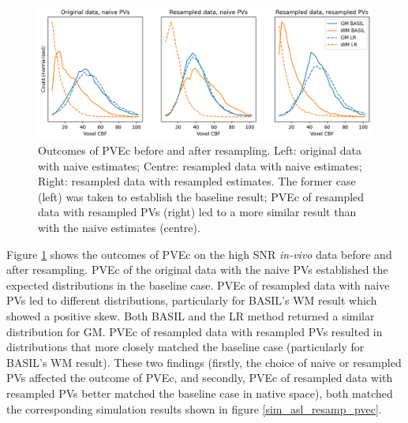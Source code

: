 \documentclass[12pt]{report}
\begin{document}
\begin{figure}[H]
\centering
\includegraphics[width = \textwidth]{real_resamp_pvec.png}
\caption{Outcomes of PVEc before and after resampling. Left: original data with naive estimates; Centre: resampled data with naive estimates; Right: resampled data with resampled estimates. The former case (left) was taken to establish the baseline result; PVEc of resampled data with resampled PVs (right) led to a more similar result than with the naive estimates (centre).}
\label{real_resamp_pvec}
\end{figure}

Figure \ref{real_resamp_pvec} shows the outcomes of PVEc on the high SNR \textit{in-vivo} data before and after resampling. PVEc of the original data with the naive PVs established the expected distributions in the baseline case. PVEc of resampled data with naive PVs led to different distributions, particularly for BASIL's WM result which showed a positive skew. Both BASIL and the LR method returned a similar distribution for GM. PVEc of resampled data with resampled PVs resulted in distributions that more closely matched the baseline case (particularly for BASIL's WM result). These two findings (firstly, the choice of naive or resampled PVs affected the outcome of PVEc, and secondly, PVEc of resampled data with resampled PVs better matched the baseline case in native space), both matched the corresponding simulation results shown in figure \ref{sim_asl_resamp_pvec}. 
\end{document}
